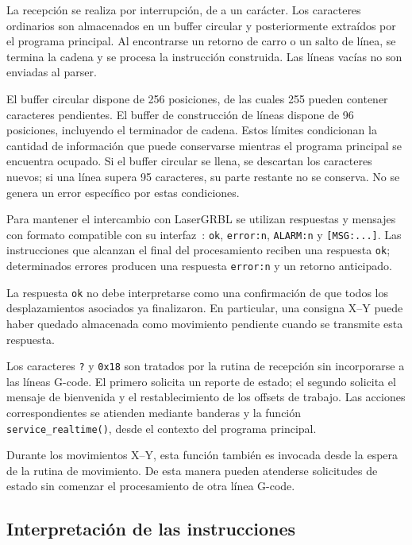 \documentclass[blue,fullpaper]{ludusofficial}  %
\begin{document}
La recepción se realiza por interrupción, de a un carácter.
Los caracteres ordinarios son almacenados en un buffer
circular y posteriormente extraídos por el programa
principal. Al encontrarse un retorno de carro o un salto
de línea, se termina la cadena y se procesa la instrucción
construida. Las líneas vacías no son enviadas al parser.

El buffer circular dispone de 256 posiciones, de las
cuales 255 pueden contener caracteres pendientes.
El buffer de construcción de líneas dispone de 96
posiciones, incluyendo el terminador de cadena.
Estos límites condicionan la cantidad de información
que puede conservarse mientras el programa principal
se encuentra ocupado. Si el buffer circular se llena, se descartan los caracteres nuevos; si una línea supera 95 caracteres, su parte restante no se conserva. No se genera un error específico por estas condiciones.

Para mantener el intercambio con LaserGRBL se utilizan
respuestas y mensajes con formato compatible con su
interfaz~\cite{grbl_interface}: \texttt{ok}, \texttt{error:n},
\texttt{ALARM:n} y \texttt{[MSG:...]}.
Las instrucciones que alcanzan el final del procesamiento
reciben una respuesta \texttt{ok}; determinados errores
producen una respuesta \texttt{error:n} y un retorno
anticipado.

La respuesta \texttt{ok} no debe interpretarse como
una confirmación de que todos los desplazamientos
asociados ya finalizaron. En particular, una consigna
X--Y puede haber quedado almacenada como movimiento
pendiente cuando se transmite esta respuesta.

Los caracteres \texttt{?} y \texttt{0x18} son tratados
por la rutina de recepción sin incorporarse a las líneas
G-code. El primero solicita un reporte de estado;
el segundo solicita el mensaje de bienvenida y
el restablecimiento de los offsets de trabajo.
Las acciones correspondientes se atienden mediante
banderas y la función \texttt{service\_realtime()},
desde el contexto del programa principal.

Durante los movimientos X--Y, esta función también
es invocada desde la espera de la rutina de movimiento.
De esta manera pueden atenderse solicitudes de estado
sin comenzar el procesamiento de otra línea G-code.

\subsection{Interpretación de las instrucciones}
\end{document}
